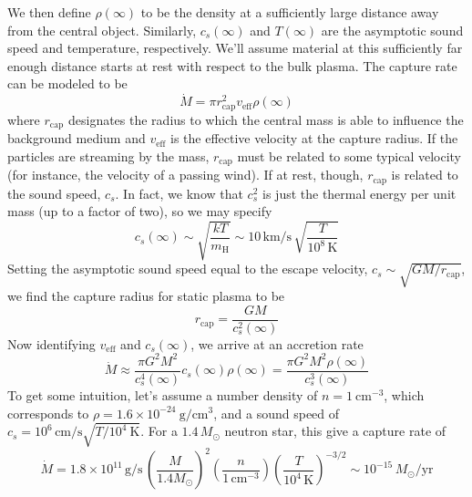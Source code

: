 \documentclass[10pt]{article}
\numberwithin{equation}{section}
\newcommand{\n}{\noindent}
\begin{document}
		\n We then define $\rho(\infty)$ to be the density at a sufficiently large distance away from the central object. Similarly, $c_s(\infty)$ and $T(\infty)$ are the asymptotic sound speed and temperature, respectively. We'll assume material at this sufficiently far enough distance starts at rest with respect to the bulk plasma. The capture rate can be modeled to be
		\begin{equation}
			\label{eq:acc:9a} \dot{M} = \pi r_{\mathrm{cap}}^2 v_{\mathrm{eff}}\rho(\infty)
		\end{equation}
		where $r_{\mathrm{cap}}$ designates the radius to which the central mass is able to influence the background medium and $v_{\mathrm{eff}}$ is the effective velocity at the capture radius. If the particles are streaming by the mass, $r_{\mathrm{cap}}$ must be related to some typical velocity (for instance, the velocity of a passing wind). If at rest, though, $r_{\mathrm{cap}}$ is related to the sound speed, $c_{s}$. In fact, we know that $c_s^2$ is just the thermal energy per unit mass (up to a factor of two), so we may specify
		\begin{equation}
			\label{eq:acc:9b} c_s(\infty)\sim \sqrt{\frac{kT}{m_{\mathrm{H}}}} \sim 10\,\mathrm{km/s}\,\sqrt{\frac{T}{10^8\,\mathrm{K}}}
		\end{equation}
		Setting the asymptotic sound speed equal to the escape velocity, $c_s \sim \sqrt{GM/r_{\mathrm{cap}}}$, we find the capture radius for static plasma to be
		\begin{equation}
			\label{eq:9c} r_{\mathrm{cap}} = \frac{GM}{c_s^2(\infty)}
		\end{equation}
		Now identifying $v_{\mathrm{eff}}$ and $c_s(\infty)$, we arrive at an accretion rate
		\begin{equation}
			\label{eq:acc:10} \dot{M} \approx \frac{\pi G^2 M^2}{c_s^4(\infty)}c_s(\infty)\rho(\infty) = \frac{\pi G^2 M^2\rho(\infty)}{c^3_s(\infty)}
		\end{equation}
		To get some intuition, let's assume a number density of $n=1\ \mathrm{cm^{-3}}$, which corresponds to $\rho=1.6\times 10^{-24}\ \mathrm{g/cm^3}$, and a sound speed of $c_s=10^6\,\mathrm{cm/s}\sqrt{T/10^4\ \mathrm{K}}$. For a $1.4\,M_\odot$ neutron star, this give a capture rate of 
		\begin{equation}
			\label{eq:acc:11} \dot{M} = 1.8\times 10^{11}\,\mathrm{g/s}\,\left(\frac{M}{1.4M_\odot}\right)^2\left(\frac{n}{1\,\mathrm{cm^{-3}}}\right)\left(\frac{T}{10^4\,\mathrm{K}}\right)^{-3/2} \sim 10^{-15}\,M_\odot/\mathrm{yr}
		\end{equation}
\end{document}
